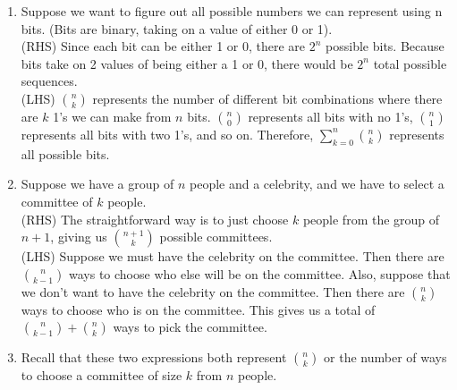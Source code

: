 \documentclass[11pt]{article}
\begin{document}
\begin{solution}{4}
\begin{enumerate}
    \item Suppose we want to figure out all possible
    numbers we can represent using n bits.  (Bits are binary, taking on a value of either 0 or 1). \\
    
    (RHS) Since each bit can be either 1 or 0, there are $2^n$ possible bits. Because bits take on 2 values of being either a 1 or 0, there would be 
    $2^n$ total possible sequences. \\
    
    (LHS) ${n \choose k}$ represents the number
    of different bit combinations where there are $k$ 1's we can make from $n$ bits.
    ${n \choose 0}$ represents all bits with no 1's,
    ${n \choose 1}$ represents all bits with two 1's,
    and so on. Therefore, $\sum_{k=0}^n {n \choose k}$ represents all possible bits. 
    \item Suppose we have a group of $n$ people and
    a celebrity, and we have to select a committee
    of $k$ people.\\
    
    (RHS) The straightforward way is to just 
    choose $k$ people from the group of $n+1$, 
    giving us ${n+1 \choose k}$ possible 
    committees.\\
    
    (LHS) Suppose we must have the celebrity on the 
    committee. Then there are ${n \choose k-1}$ 
    ways to choose who else will be on the committee.
    Also, suppose that we don't want to have
    the celebrity on the committee. Then there
    are ${n \choose k}$ ways to choose who 
    is on the committee. This gives us a total
    of ${n \choose k-1} + {n \choose k}$ ways
    to pick the committee. 
    \item Recall that these two expressions both
    represent ${n \choose k}$ or the number 
    of ways to choose a committee of size $k$ from
    $n$ people. \\
    

\end{enumerate}
\end{solution}
\end{document}
